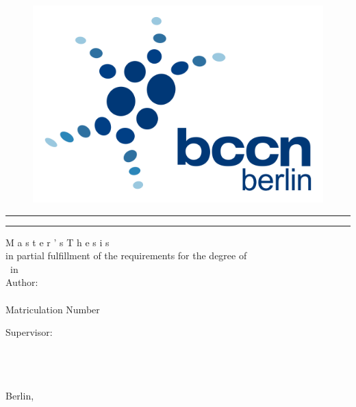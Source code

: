 \begin{titlepage}
\begin{figure}[!htb]
\endminipage\hfill
{}%
  \includegraphics[width=\linewidth]{Logos/bccn.png}
\endminipage
\end{figure}

\begin{center}
\rule{\linewidth}{0.5mm}
\LARGE \textbf{ \ttitle}
\rule{\linewidth}{0.5mm}
\vspace*{0.3cm}

\Large {M a s t e r ' s   T h e s i s}\\
\vspace*{0.5cm}
\large in partial fulfillment of the requirements for the degree of\\
\vspace*{0.5cm}
\LARGE \degreename \ in \subjectname
\vspace*{1.0cm}
\large
\\Author:\\

\LARGE \authorname \\
\large Matriculation Number \matriculation

\vspace*{0.5cm}
\large
Supervisor:\\
\LARGE
\supname\\
\vspace*{0.2cm}
\Large
    \groupname\\
\vspace*{0.2cm}
\large \univname \\


\date{}
\vspace*{0.9cm}
\Large Berlin, 

\end{center}
\end{titlepage}